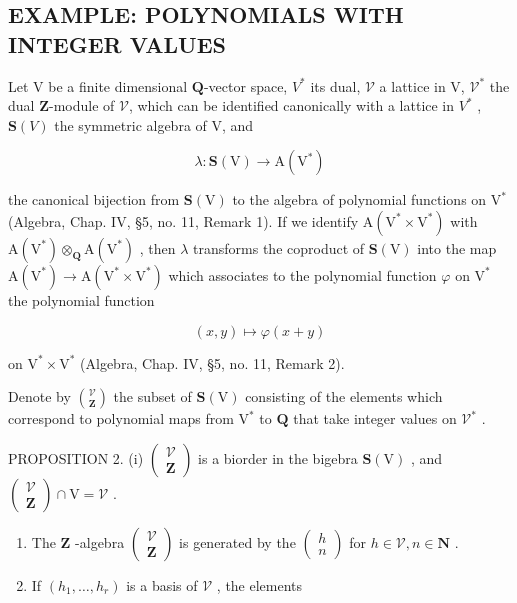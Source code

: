 \subsection{EXAMPLE: POLYNOMIALS WITH INTEGER VALUES}

Let V be a finite dimensional \(\mathbf{Q}\)-vector space, \(V^{*}\) its dual, \(\mathcal{V}\) a lattice in V, \(\mathcal{V}^{*}\) the dual \(\mathbf{Z}\)-module of \(\mathcal{V}\), which can be identified canonically with a lattice in \(V^{*}\) , \(\mathbf{S}(V)\) the symmetric algebra of V, and

\[
\lambda : \mathbf {S} (\mathrm{V}) \to \mathrm{A} (\mathrm{V} ^ {*})
\]

the canonical bijection from \(\mathbf{S}(\mathrm{V})\) to the algebra of polynomial functions on \(\mathrm{V}^*\) (Algebra, Chap. IV, §5, no. 11, Remark 1). If we identify \(\mathrm{A}(\mathrm{V}^* \times \mathrm{V}^*)\) with \(\mathrm{A}(\mathrm{V}^*) \otimes_{\mathbf{Q}} \mathrm{A}(\mathrm{V}^*)\) , then \(\lambda\) transforms the coproduct of \(\mathbf{S}(\mathrm{V})\) into the map \(\mathrm{A}(\mathrm{V}^*) \to \mathrm{A}(\mathrm{V}^* \times \mathrm{V}^*)\) which associates to the polynomial function \(\varphi\) on \(\mathrm{V}^*\) the polynomial function

\[
(x, y) \mapsto \varphi (x + y)
\]

on \(\mathrm{V}^* \times \mathrm{V}^*\) (Algebra, Chap. IV, §5, no. 11, Remark 2).

Denote by \(\binom{\mathcal{V}}{\mathbf{Z}}\) the subset of \(\mathbf{S}(\mathrm{V})\) consisting of the elements which correspond to polynomial maps from \(\mathrm{V}^*\) to \(\mathbf{Q}\) that take integer values on \(\mathcal{V}^*\) .

PROPOSITION 2. (i) \(\begin{pmatrix} \mathcal{V} \\ \mathbf{Z} \end{pmatrix}\) is a biorder in the bigebra \(\mathbf{S}(\mathrm{V})\) , and \(\begin{pmatrix} \mathcal{V} \\ \mathbf{Z} \end{pmatrix} \cap \mathrm{V} = \mathcal{V}\) .

\begin{enumerate}
\def\labelenumi{(\roman{enumi})}
\setcounter{enumi}{1}
\item
  The \(\mathbf{Z}\) -algebra \(\left( \begin{array}{c}\mathcal{V}\\ \mathbf{Z} \end{array} \right)\) is generated by the \(\left( \begin{array}{c}h\\ n \end{array} \right)\) for \(h\in \mathcal{V},n\in \mathbf{N}\) .
\item
  If \((h_1, \ldots, h_r)\) is a basis of \(\mathcal{V}\) , the elements
\end{enumerate}

